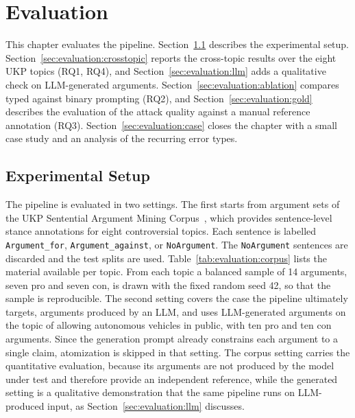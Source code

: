 %
\chapter{Evaluation}
\label{sec:evaluation}

This chapter evaluates the pipeline. Section~\ref{sec:evaluation:setup} describes
the experimental setup. Section~\ref{sec:evaluation:crosstopic} reports the
cross-topic results over the eight UKP topics (RQ1, RQ4), and
Section~\ref{sec:evaluation:llm} adds a qualitative check on LLM-generated
arguments. Section~\ref{sec:evaluation:ablation} compares typed against binary
prompting (RQ2), and Section~\ref{sec:evaluation:gold} describes the
evaluation of the attack quality against a manual reference annotation (RQ3).
Section~\ref{sec:evaluation:case} closes the chapter with a small case study
and an analysis of the recurring error types.

\section{Experimental Setup}
\label{sec:evaluation:setup}

The pipeline is evaluated in two settings. The first starts from argument sets of
the UKP Sentential Argument Mining Corpus~\cite{stab2018}, which provides
sentence-level stance annotations for eight controversial topics. Each sentence
is labelled \texttt{Argument\_for}, \texttt{Argument\_against}, or
\texttt{NoArgument}. The \texttt{NoArgument} sentences are discarded and the
test splits are used. Table~\ref{tab:evaluation:corpus} lists the material
available per topic. From each topic a balanced sample of 14 arguments, seven
pro and seven con, is drawn with the fixed random seed 42, so that the sample
is reproducible. The second setting covers the case the pipeline ultimately
targets, arguments produced by an LLM, and uses LLM-generated arguments on the
topic of allowing autonomous vehicles in public, with ten pro and ten con
arguments. Since the generation prompt already constrains each argument to a
single claim, atomization is skipped in that setting. The corpus setting
carries the quantitative evaluation, because its arguments are not produced by
the model under test and therefore provide an independent reference, while the
generated setting is a qualitative demonstration that the same pipeline runs
on LLM-produced input, as Section~\ref{sec:evaluation:llm} discusses.

\begin{table}[tb]
  \centering
  \caption{Arguments available in the UKP test splits after discarding
  \texttt{NoArgument} sentences. The evaluation samples seven pro and seven con
  arguments per topic with seed 42.}
  \label{tab:evaluation:corpus}
  
\end{table}

